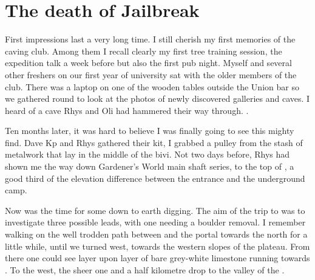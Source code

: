 \section{The death of Jailbreak}
	\begin{marginfigure}
	\end{marginfigure}


	First impressions last a very long time. I still cherish my first memories of the caving club. Among them I recall clearly my first tree training session, the expedition talk a week before but also the first pub night. Myself and several other freshers on our first year of university sat with the older members of the club. There was a laptop on one of the wooden tables outside the Union bar so we gathered round to look at the photos of newly discovered galleries and caves. I heard of a cave Rhys and Oli had hammered their way through. . 

	Ten months later, it was hard to believe I was finally going to see this mighty find. Dave Kp and Rhys gathered their kit, I grabbed a pulley from the stash of metalwork that lay in the middle of the bivi. Not two days before, Rhys had shown me the way down Gardener's World main shaft series, to the top of , a good third of the elevation difference between the entrance and the underground camp. 

	Now was the time for some down to earth digging. The aim of the trip to  was to investigate three possible leads, with one needing a boulder removal. I remember walking on the well trodden path between  and the portal towards the north for a little while, until we turned west, towards the western slopes of the plateau. From there one could see layer upon layer of bare grey-white limestone running towards . To the west, the sheer one and a half kilometre drop to the valley of the . 

